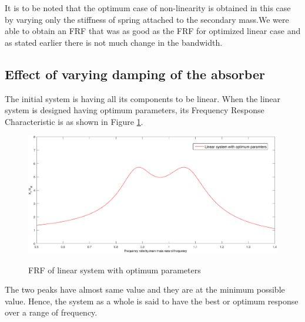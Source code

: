 It is to be noted that  the optimum case of non-linearity is obtained in this case by varying only the stiffness of spring attached to the secondary mass.We were able to obtain an FRF that was as good as the FRF for optimized linear case and as stated earlier there is not much change in the bandwidth.

\subsection{Effect of varying damping of the absorber}
The initial system is having all its components to be linear. When the linear system is designed having optimum parameters, its Frequency Response Characteristic is as shown in Figure \ref{linearopt}.\\[0.2in]
\begin{figure}[h!]
\centering
\includegraphics[width=\textwidth,height=0.5\textwidth]{"figures/linear"}\\[0.1in]
\caption{FRF of linear system with optimum parameters}
\label{linearopt}
\end{figure}
The two peaks have almost same value and they are at the minimum possible value. Hence, the system as a whole is said to have the best or optimum response over a range of frequency.

